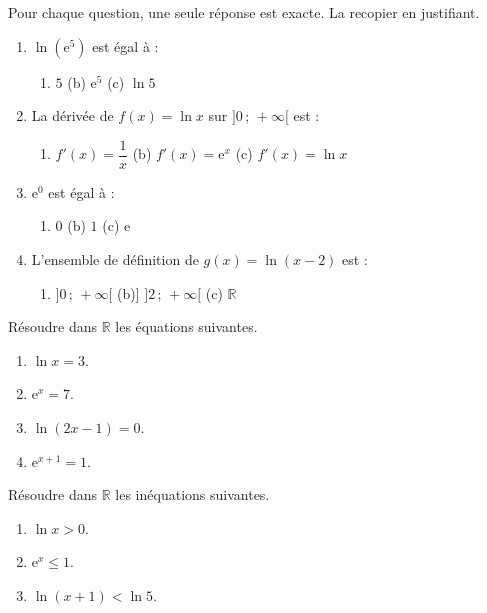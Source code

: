 \documentclass[11pt]{article}
\begin{document}
\begin{exercice}[QCM]
Pour chaque question, une seule réponse est exacte. La recopier en justifiant.
\begin{enumerate}
\item $\ln(\mathrm{e}^5)$ est égal à :
\begin{enumerate}
\item[(a)] $5$ \quad (b) $\mathrm{e}^5$ \quad (c) $\ln 5$
\end{enumerate}
\item La dérivée de $f(x) = \ln x$ sur $]0\,;\,+\infty[$ est :
\begin{enumerate}
\item[(a)] $f'(x) = \dfrac{1}{x}$ \quad (b) $f'(x) = \mathrm{e}^x$ \quad (c) $f'(x) = \ln x$
\end{enumerate}
\item $\mathrm{e}^0$ est égal à :
\begin{enumerate}
\item[(a)] $0$ \quad (b) $1$ \quad (c) $\mathrm{e}$
\end{enumerate}
\item L'ensemble de définition de $g(x) = \ln(x-2)$ est :
\begin{enumerate}
\item[(a)] $]0\,;\,+\infty[$ \quad (b)] $]2\,;\,+\infty[$ \quad (c) $\mathbb{R}$
\end{enumerate}
\end{enumerate}
\end{exercice}

\begin{exercice}
Résoudre dans $\mathbb{R}$ les équations suivantes.
\begin{enumerate}
\item $\ln x = 3$.
\item $\mathrm{e}^x = 7$.
\item $\ln(2x-1) = 0$.
\item $\mathrm{e}^{x+1} = 1$.
\end{enumerate}
\end{exercice}

\begin{exercice}
Résoudre dans $\mathbb{R}$ les inéquations suivantes.
\begin{enumerate}
\item $\ln x > 0$.
\item $\mathrm{e}^x \leqslant 1$.
\item $\ln(x+1) < \ln 5$.
\end{enumerate}
\end{exercice}
\end{document}
